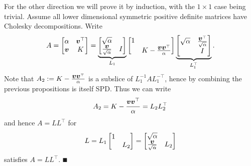For the other direction we will prove it by induction, with the $1 \ensuremath{\times} 1$ case being trivial. Assume all lower dimensional symmetric positive definite matrices have Cholesky decompositions. Write
\[
A = \begin{bmatrix} \alpha & \bm{{\mbox{\boldmath$v$\unboldmath}}}^\top \\
                    \bm{{\mbox{\boldmath$v$\unboldmath}}}   & K
                    \end{bmatrix} = \underbrace{\begin{bmatrix} \sqrt{\alpha} \\
                                    {\bm{{\mbox{\boldmath$v$\unboldmath}}} \over \sqrt{\alpha}} & I \end{bmatrix}}_{L_1}
                                    \begin{bmatrix} 1  \\ & K - {\bm{{\mbox{\boldmath$v$\unboldmath}}} \bm{{\mbox{\boldmath$v$\unboldmath}}}^\top \over \alpha} \end{bmatrix}
                                    \underbrace{\begin{bmatrix} \sqrt{\alpha} & {\bm{{\mbox{\boldmath$v$\unboldmath}}}^\top \over \sqrt{\alpha}} \\
                                     & I \end{bmatrix}}_{L_1^\top}.
\]
Note that $A_2 := K - {\bm{{\mbox{\boldmath$v$\unboldmath}}} \bm{{\mbox{\boldmath$v$\unboldmath}}}^\top \over \alpha}$ is a subslice of $L_1^{-1} A L_1^{-\ensuremath{\top}}$, hence by combining the previous propositions is itself SPD. Thus we can write
\[
A_2 = K - {\bm{{\mbox{\boldmath$v$\unboldmath}}} \bm{{\mbox{\boldmath$v$\unboldmath}}}^\top \over \alpha} = L_2 L_2^\top
\]
and hence $A = L L^\ensuremath{\top}$ for
\[
L= L_1 \begin{bmatrix}1 \\ & L_2 \end{bmatrix} = \begin{bmatrix} \sqrt{\alpha} \\ {\bm{{\mbox{\boldmath$v$\unboldmath}}} \over \sqrt{\alpha}} & L_2 \end{bmatrix}
\]
satisfies $A = L L^\ensuremath{\top}$. \ensuremath{\QED}

